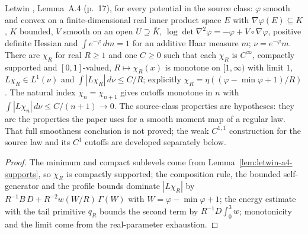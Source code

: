 \begin{lemma}
  \label{lem:letwin-a4-cutoffs}
  \leanok
  Letwin \cite{Letwin2026QuadraticKLS}, Lemma~A.4 (p.~17), for every potential in the source class: $\varphi$ smooth and
  convex on a finite-dimensional real inner product space $E$ with $\nabla\varphi(E)\subseteq K$, $K$ bounded, $V$ smooth
  on an open $U\supseteq\overline K$, $\log\det\nabla^2\varphi=-\varphi+V\circ\nabla\varphi$, positive definite Hessian
  and $\int e^{-\varphi}\,dm=1$ for an additive Haar measure $m$; $\nu=e^{-\varphi}m$.  There are $\chi_R$ for real
  $R\ge1$ and one $C\ge0$ such that each $\chi_R$ is $C^\infty$, compactly supported and $[0,1]$-valued, $R\mapsto
  \chi_R(x)$ is monotone on $[1,\infty)$ with limit $1$, $L\chi_R\in L^1(\nu)$ and $\int|L\chi_R|\,d\nu\le C/R$; explicitly
  $\chi_R=\eta((\varphi-\min\varphi+1)/R)$.  The natural index $\chi_n=\chi_{n+1}$ gives cutoffs monotone in $n$ with
  $\int|L\chi_n|\,d\nu\le C/(n+1)\to0$.  The source-class properties are hypotheses: they are the properties the paper
  uses for a smooth moment map of a regular law. That full smoothness conclusion is not proved; the weak $C^{1,1}$ construction for the source law and its $C^1$ cutoffs are developed separately below.
\end{lemma}
\begin{proof}
  \leanok
  The minimum and compact sublevels come from Lemma~\ref{lem:letwin-a4-supports}, so $\chi_R$ is compactly supported;
  the composition rule, the bounded self-generator and the profile bounds dominate $|L\chi_R|$ by
  $R^{-1}B\,D+R^{-2}w(W/R)\,\Gamma(W)$ with $W=\varphi-\min\varphi+1$; the energy estimate with the tail primitive $q_R$
  bounds the second term by $R^{-1}D\int_0^3w$; monotonicity and the limit come from the real-parameter exhaustion.
\end{proof}

